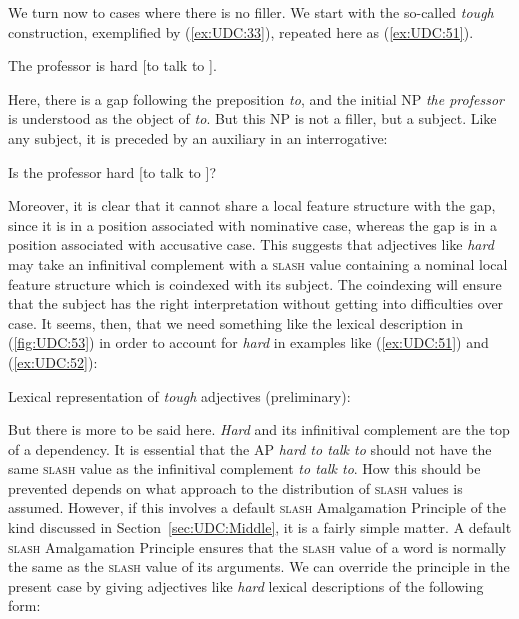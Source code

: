 \documentclass[output=paper,biblatex,babelshorthands,newtxmath,draftmode,colorlinks,citecolor=brown]{langscibook}
\begin{document}
We\label{udc:page-no-filler-start} turn now to cases where there is no filler. We start with the
so-called \emph{tough} construction, exemplified by (\ref{ex:UDC:33}), repeated here as
(\ref{ex:UDC:51}).

\begin{exe}
\ex \label{ex:UDC:51}
The professor is hard [to talk to \trace{}].
\end{exe}

\noindent
Here, there is a gap following the preposition \emph{to}, and the
initial NP \emph{the professor} is understood as the object of
\emph{to}. But this NP is not a filler, but a subject. Like any subject,
it is preceded by an auxiliary in an interrogative:

\begin{exe}
\ex \label{ex:UDC:52}
 Is the professor hard [to talk to \trace{}]?
\end{exe}
 
\noindent
Moreover, it is clear that it cannot share a local feature structure
with the gap, since it is in a position associated with nominative case,
whereas the gap is in a position associated with accusative case. This
suggests that adjectives like \emph{hard} may take an infinitival
complement with a \textsc{slash} value containing a nominal local feature
structure which is coindexed with its subject. The coindexing will
ensure that the subject has the right interpretation without getting
into difficulties over case. It seems, then, that we need something like
the lexical description in (\ref{fig:UDC:53}) in order to account for \emph{hard} in examples like (\ref{ex:UDC:51})
and (\ref{ex:UDC:52}):
  
\ea
\label{fig:UDC:53}
Lexical representation of \textit{tough} adjectives (preliminary):\\
\z

\noindent
But there is more to be said here. \emph{Hard} and its infinitival
complement are the top of a dependency. It is essential that the AP
\emph{hard to talk to} should not have the same \textsc{slash} value
as the infinitival complement \emph{to talk to}. How this should be
prevented depends on what approach to the distribution of
\textsc{slash} values is assumed.  However, if this involves a default
\textsc{slash} Amalgamation Principle of the kind discussed in
Section~\ref{sec:UDC:Middle}, it is a fairly simple matter. A default
\textsc{slash} Amalgamation Principle ensures that the \textsc{slash}
value of a word is normally the same as the \textsc{slash} value of
its arguments. We can override the principle in the present case by
giving adjectives like \emph{hard} lexical descriptions of the
following form:
\end{document}
